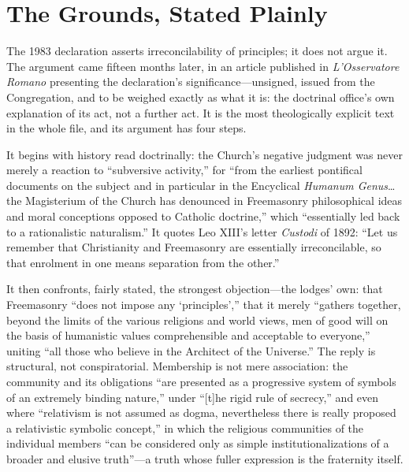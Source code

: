 \section{The Grounds, Stated Plainly}

The 1983 declaration asserts irreconcilability of principles; it does not argue it. The argument came fifteen months later, in an article published in \emph{L'Osservatore Romano} presenting the declaration's significance---unsigned, issued from the Congregation, and to be weighed exactly as what it is: the doctrinal office's own explanation of its act, not a further act. It is the most theologically explicit text in the whole file, and its argument has four steps.

It begins with history read doctrinally: the Church's negative judgment was never merely a reaction to ``subversive activity,'' for ``from the earliest pontifical documents on the subject and in particular in the Encyclical \emph{Humanum Genus}\ldots the Magisterium of the Church has denounced in Freemasonry philosophical ideas and moral conceptions opposed to Catholic doctrine,'' which ``essentially led back to a rationalistic naturalism.'' It quotes Leo XIII's letter \emph{Custodi} of 1892: ``Let us remember that Christianity and Freemasonry are essentially irreconcilable, so that enrolment in one means separation from the other.''

It then confronts, fairly stated, the strongest objection---the lodges' own: that Freemasonry ``does not impose any `principles','' that it merely ``gathers together, beyond the limits of the various religions and world views, men of good will on the basis of humanistic values comprehensible and acceptable to everyone,'' uniting ``all those who believe in the Architect of the Universe.'' The reply is structural, not conspiratorial. Membership is not mere association: the community and its obligations ``are presented as a progressive system of symbols of an extremely binding nature,'' under ``[t]he rigid rule of secrecy,'' and even where ``relativism is not assumed as dogma, nevertheless there is really proposed a relativistic symbolic concept,'' in which the religious communities of the individual members ``can be considered only as simple institutionalizations of a broader and elusive truth''---a truth whose fuller expression is the fraternity itself.

